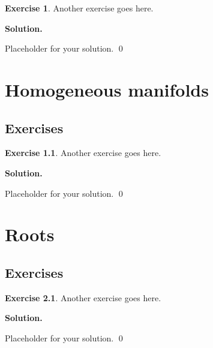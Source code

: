 \documentclass[12pt]{book}
\theoremstyle{definition}
\newtheorem{exercise}{Exercise}[chapter]
\newenvironment{solution}
{%
  \par\noindent\textbf{Solution.}\quad
}
{%
  \qed\par
}
\begin{document}
\begin{exercise}
Another exercise goes here.
\end{exercise}

\begin{solution}
Placeholder for your solution.
\end{solution}

\chapter{Homogeneous manifolds}
\section{Exercises}

\begin{exercise}
Another exercise goes here.
\end{exercise}

\begin{solution}
Placeholder for your solution.
\end{solution}

\chapter{Roots}
\section{Exercises}

\begin{exercise}
Another exercise goes here.
\end{exercise}

\begin{solution}
Placeholder for your solution.
\end{solution}

\end{document}
